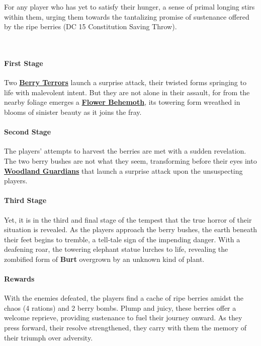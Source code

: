 For any player who has yet to satisfy their hunger, a sense of primal longing stirs within them, urging them towards the tantalizing promise of sustenance offered by the ripe berries (DC 15 Constitution Saving Throw).

\hfill\\

\paragraph*{First Stage}
Two \hyperref[sec:BerryTerror]{\textbf{Berry Terrors}} launch a surprise attack, their twisted forms springing to life with malevolent intent. But they are not alone in their assault, for from the nearby foliage emerges a \hyperref[sec:FlowerBehemoth]{\textbf{Flower Behemoth}}, its towering form wreathed in blooms of sinister beauty as it joins the fray.

\paragraph*{Second Stage}
The players' attempts to harvest the berries are met with a sudden revelation. The two berry bushes are not what they seem, transforming before their eyes into \hyperref[sec:WoodlandGuardian]{\textbf{Woodland Guardians}} that launch a surprise attack upon the unsuspecting players.

\paragraph*{Third Stage}
Yet, it is in the third and final stage of the tempest that the true horror of their situation is revealed. As the players approach the berry bushes, the earth beneath their feet begins to tremble, a tell-tale sign of the impending danger. With a deafening roar, the towering elephant statue lurches to life, revealing the zombified form of \textbf{Burt} overgrown by an unknown kind of plant.

\paragraph*{Rewards}
With the enemies defeated, the players find a cache of ripe berries amidst the chaos (4 rations) and 2 berry bombs. Plump and juicy, these berries offer a welcome reprieve, providing sustenance to fuel their journey onward. As they press forward, their resolve strengthened, they carry with them the memory of their triumph over adversity.

